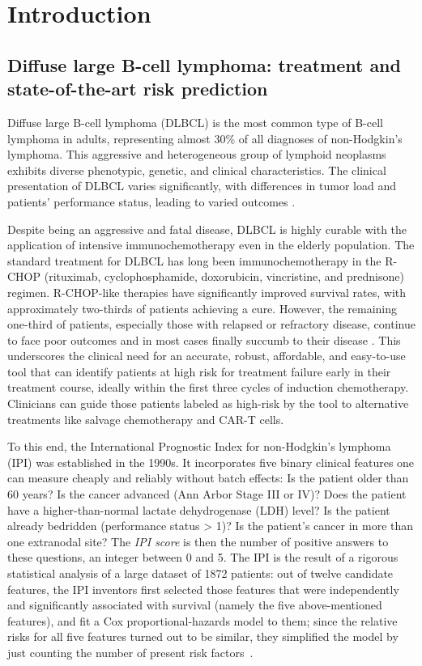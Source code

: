 \chapter{Introduction} \label{chap:intro}

\section{Diffuse large B-cell lymphoma: treatment and state-of-the-art risk prediction}

Diffuse large B-cell lymphoma (DLBCL) is the most common type of B-cell lymphoma in adults, 
representing almost 30\% of all diagnoses of non-Hodgkin's lymphoma. 
This aggressive and heterogeneous group of 
lymphoid neoplasms exhibits
diverse phenotypic, genetic, and clinical characteristics. The clinical presentation of 
DLBCL varies significantly, with differences in tumor load and patients' performance status, leading 
to varied outcomes \cite{dlbcl-review21}.

Despite being an aggressive and fatal disease, DLBCL is highly curable with the 
application of intensive immunochemotherapy even in the elderly population. The standard treatment 
for DLBCL has long been immunochemotherapy in the R-CHOP (rituximab, cyclophosphamide, doxorubicin, 
vincristine, and prednisone) regimen. R-CHOP-like therapies
have significantly improved survival rates, with approximately two-thirds of patients 
achieving a cure. However, the remaining one-third of patients, especially 
those with relapsed or refractory disease, continue to face poor outcomes and in most cases finally 
succumb to their disease \citep{glass17}. This underscores the clinical 
need for an accurate, robust, affordable, and easy-to-use tool that can identify patients at high risk 
for treatment failure early in their treatment course, ideally within the first three cycles of 
induction chemotherapy. Clinicians can guide those patients labeled as high-risk by the tool to 
alternative treatments like salvage chemotherapy and CAR-T cells. 

To this end, the International Prognostic Index for non-Hodgkin's lymphoma (IPI) was established in 
the 1990s. It incorporates five binary clinical features one can measure cheaply and 
reliably without batch effects: Is the patient older than \num{60} years? Is the cancer advanced 
(Ann Arbor Stage III or IV)? Does the patient have a higher-than-normal lactate dehydrogenase (LDH) 
level? Is the patient already 
bedridden (performance status > 1)? Is the patient's cancer in more than one extranodal site? The 
\textit{IPI score} is then the number of positive answers to these questions, an integer between 0 
and 5. The IPI is the result of a rigorous statistical analysis 
of a large dataset of \num{1872} patients: out of twelve candidate features, the IPI inventors
first selected those features that were independently and significantly associated with survival 
(namely the five above-mentioned features), and fit a Cox proportional-hazards model to them;
since the relative risks for all five features turned out to be similar, they simplified the model 
by just counting the number of present risk factors~\cite{ipi93}. 

